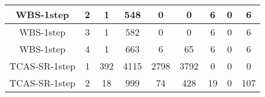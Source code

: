 \begin{table*}[]
\begin{tabular}{@{}ccccccccc@{}}
        WBS-1step                                                   & 2                                                            & 1                                                          & 548                                                         & 0                                                              & 0                                                              & 6                                                          & 0                                                             & 6        \\ \midrule
        WBS-1step                                                   & 3                                                            & 1                                                          & 582                                                         & 0                                                              & 0                                                              & 6                                                          & 0                                                             & 6        \\ \midrule
        WBS-1step                                                   & 4                                                            & 1                                                          & 663                                                         & 6                                                              & 65                                                             & 6                                                          & 0                                                             & 6        \\ \midrule
        TCAS-SR-1step                                               & 1                                                            & 392                                                        & 4115                                                        & 2798                                                           & 3792                                                           & 0                                                          & 0                                                             & 0        \\ \midrule
        TCAS-SR-1step                                               & 2                                                            & 18                                                         & 999                                                         & 74                                                             & 428                                                            & 19                                                         & 0                                                             & 107      \\ \midrule

\end{tabular}
\end{table*}
